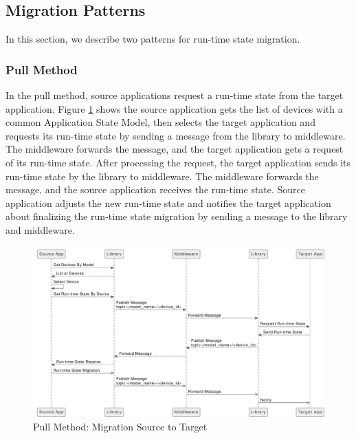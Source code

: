 \subsection{Migration Patterns}
In this section, we describe two patterns for run-time state migration.

\subsubsection{Pull Method}
In the pull method, source applications request a run-time state from the target application. Figure \ref{fig:Migration-Source-to-Target-Pull-Method} shows the source application gets the list of devices with a common Application State Model, then selects the target application and requests its run-time state by sending a message from the library to middleware. The middleware forwards the message, and the target application gets a request of its run-time state. After processing the request, the target application sends its run-time state by the library to middleware. The middleware forwards the message, and the source application receives the run-time state. Source application adjusts the new run-time state and notifies the target application about finalizing the run-time state migration by sending a message to the library and middleware. 

\FloatBarrier \begin{figure}[H]
    \includegraphics[width=\linewidth]{../figures/Migration-Source-to-Target-Pull-Method}
    \centering
    \caption{Pull Method: Migration Source to Target}
    \label{fig:Migration-Source-to-Target-Pull-Method}
\end{figure} \FloatBarrier

